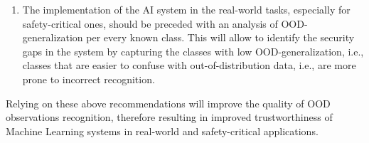 \begin{enumerate}
    \item The implementation of the AI system in the real-world tasks, especially for safety-critical ones, should be preceded with an analysis of OOD-generalization per every known class. This will allow to identify the security gaps in the system by capturing the classes with low OOD-generalization, i.e., classes that are easier to confuse with out-of-distribution data, i.e., are more prone to incorrect recognition.
\end{enumerate}

Relying on these above recommendations will improve the quality of OOD observations recognition, therefore resulting in improved trustworthiness of Machine Learning systems in real-world and safety-critical applications.

\cleardoublepage{}
